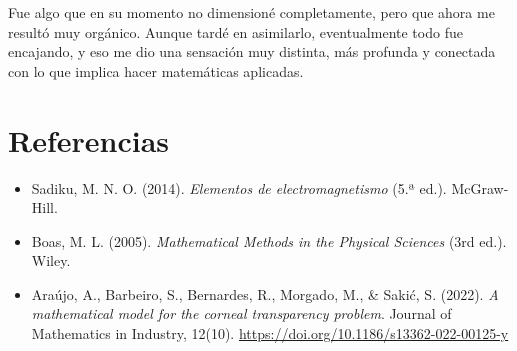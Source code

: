 \documentclass[10pt,a4paper]{article}
\begin{document}
Fue algo que en su momento no dimensioné completamente, pero que ahora me resultó muy orgánico. Aunque tardé en asimilarlo, eventualmente todo fue encajando, y eso me dio una sensación muy distinta, más profunda y conectada con lo que implica hacer matemáticas aplicadas.

\newpage

\section{Referencias}

\begin{itemize}
    \item Sadiku, M. N. O. (2014). \textit{Elementos de electromagnetismo} (5.ª ed.). McGraw-Hill.
    \item Boas, M. L. (2005). \textit{Mathematical Methods in the Physical Sciences} (3rd ed.). Wiley.
    \item Araújo, A., Barbeiro, S., Bernardes, R., Morgado, M., \& Sakić, S. (2022). \textit{A mathematical model for the corneal transparency problem}. Journal of Mathematics in Industry, 12(10). \url{https://doi.org/10.1186/s13362-022-00125-y}
\end{itemize}
\end{document}
